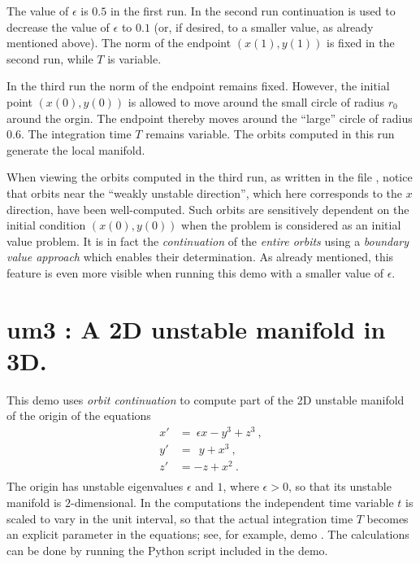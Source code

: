 \documentclass[12pt]{report}
\def\eps{\epsilon}
\begin{document}
The value of $\eps$ is $0.5$ in the first run. In the second run continuation
is used to decrease the value of $\eps$ to $0.1$ (or, if desired, to a smaller 
value, as already mentioned above). The norm of the endpoint  $(x(1),y(1))$
is fixed in the second run, while $T$ is variable.

In the third run the norm of the endpoint remains fixed. However, the 
initial point $(x(0),y(0))$ is allowed to move around the small circle of 
radius $r_0$ around the orgin.  The endpoint thereby moves around the ``large''
circle of radius $0.6$. The integration time $T$ remains variable.
The orbits computed in this run generate the local 
manifold.

When viewing the orbits computed in the third run, as written in the file 
, notice that orbits near the ``weakly unstable direction'',
which here corresponds to the $x$ direction, have been well-computed. Such 
orbits are sensitively dependent on the initial condition $(x(0),y(0))$ when 
the problem is considered as an initial value problem. It is in fact the 
{\it continuation} of the {\it entire orbits} using a {\it boundary value 
approach} which enables their determination. As already mentioned, this 
feature is even more visible when running this demo with a smaller value 
of $\eps$.
\newpage

\section{ um3 : A 2D unstable manifold in 3D.} \label{sec:Demos_um3}
This demo uses {\it orbit continuation} to compute part of the 2D unstable 
manifold of the origin of the equations
\begin{equation} \begin{array}{cl}
 x' &= ~\eps x - y^3 + z^3~, \\
 y' &=   ~~y + x^3~, \\
 z' &=    -z + x^2~. \\
\end{array} \end{equation}
The origin has unstable eigenvalues $\eps$ and $1$, where $\eps>0$, so that its 
unstable manifold is $2$-dimensional. 
In the computations the independent time variable $t$ is scaled to vary in
the unit interval, so that the actual integration time $T$ becomes an 
explicit parameter in the equations; see, for example, demo .
The calculations can be done by running the Python script  
included in the demo. 
\end{document}
